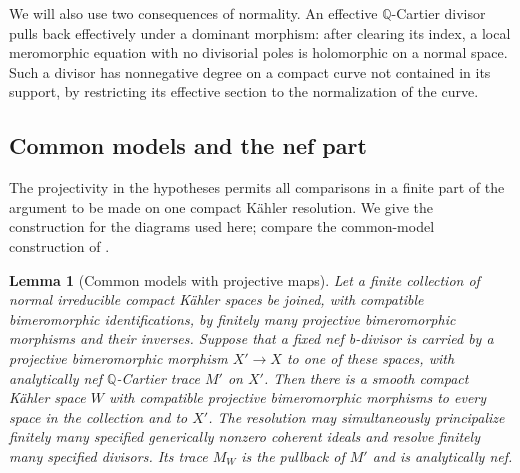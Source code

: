 \documentclass[11pt]{amsart}
\newtheorem{lemma}[theorem]{Lemma}
\theoremstyle{definition}
\theoremstyle{remark}
\numberwithin{equation}{section}
\newcommand{\Q}{\mathbb{Q}}
\begin{document}
We will also use two consequences of normality.  An effective
$\Q$-Cartier divisor pulls back effectively under a dominant morphism:
after clearing its index, a local meromorphic equation with no
divisorial poles is holomorphic on a normal space.  Such a divisor has
nonnegative degree on a compact curve not contained in its support,
by restricting its effective section to the normalization of the curve.

\subsection{Common models and the nef part}

The projectivity in the hypotheses permits all comparisons in a finite
part of the argument to be made on one compact K\"ahler resolution.
We give the construction for the diagrams used here; compare the
common-model construction of \cite[Proposition~2.1]{CanonicalKahler}.

\begin{lemma}[Common models with projective maps]\label{lem:common-projective-models}
Let a finite collection of normal irreducible compact K\"ahler spaces
be joined, with compatible bimeromorphic identifications, by finitely
many projective bimeromorphic morphisms and their inverses.  Suppose
that a fixed nef b-divisor is carried by a projective bimeromorphic
morphism $X'\to X$ to one of these spaces, with analytically nef
$\Q$-Cartier trace $M'$ on $X'$.  Then there is a
smooth compact K\"ahler space $W$ with compatible projective
bimeromorphic morphisms to every space in the collection and to $X'$.
The resolution may simultaneously principalize finitely many specified
generically nonzero coherent ideals and resolve finitely many specified divisors.  Its trace
$M_W$ is the pullback of $M'$ and is analytically nef.
\end{lemma}
\end{document}
